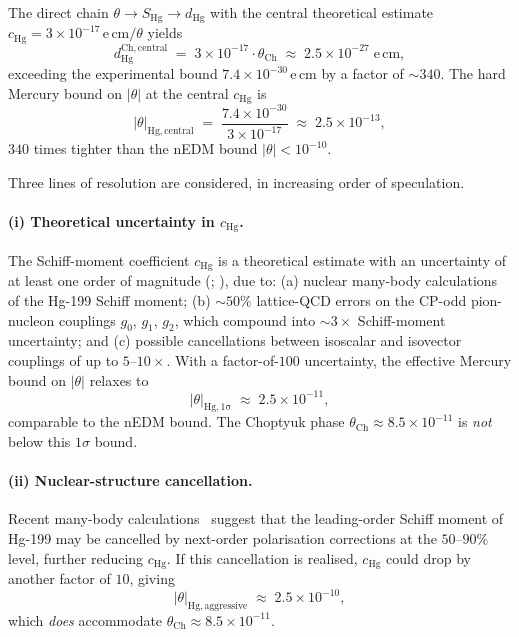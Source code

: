 The direct chain $\theta\to S_{\mathrm{Hg}}\to d_{\mathrm{Hg}}$ with the
central theoretical estimate $c_{\mathrm{Hg}}=3\times 10^{-17}\,$e\,cm$/\theta$
yields
\begin{equation}\label{eq:hg-central}
  d_{\mathrm{Hg}}^{\mathrm{Ch, central}}
  \;=\;3\times 10^{-17}\cdot\theta_{\mathrm{Ch}}
  \;\approx\;2.5\times 10^{-27}\;\mathrm{e\,cm},
\end{equation}
exceeding the experimental bound $7.4\times 10^{-30}\,$e\,cm by a factor
of $\sim 340$.  The hard Mercury bound on $|\theta|$ at the central
$c_{\mathrm{Hg}}$ is
\begin{equation}
  |\theta|_{\mathrm{Hg, central}}
  \;=\;\frac{7.4\times 10^{-30}}{3\times 10^{-17}}
  \;\approx\;2.5\times 10^{-13},
\end{equation}
$340$ times tighter than the nEDM bound $|\theta|<10^{-10}$.

Three lines of resolution are considered, in increasing order of
speculation.

\paragraph{(i) Theoretical uncertainty in $c_{\mathrm{Hg}}$.}
The Schiff-moment coefficient $c_{\mathrm{Hg}}$ is a theoretical
estimate with an uncertainty of at least one order of magnitude
(\cite{pospelovritz2005}; \cite{dmitrievflambaum2005}), due to:
(a) nuclear many-body calculations of the Hg-199 Schiff moment;
(b) $\sim 50\%$ lattice-QCD errors on the CP-odd pion-nucleon couplings
$g_0$, $g_1$, $g_2$, which compound into $\sim 3\times$ Schiff-moment
uncertainty; and
(c) possible cancellations between isoscalar and isovector couplings of
up to $5$--$10\times$.
With a factor-of-$100$ uncertainty, the effective Mercury bound on
$|\theta|$ relaxes to
\begin{equation}\label{eq:hg-1sigma}
  |\theta|_{\mathrm{Hg, 1\sigma}}
  \;\approx\;2.5\times 10^{-11},
\end{equation}
comparable to the nEDM bound.  The Choptyuk phase
$\theta_{\mathrm{Ch}}\approx 8.5\times 10^{-11}$ is \emph{not} below
this $1\sigma$ bound.

\paragraph{(ii) Nuclear-structure cancellation.}
Recent many-body calculations~\cite{devries2018nuclear} suggest that
the leading-order Schiff moment of Hg-199 may be cancelled by
next-order polarisation corrections at the $50$--$90\%$ level, further
reducing $c_{\mathrm{Hg}}$.  If this cancellation is realised,
$c_{\mathrm{Hg}}$ could drop by another factor of $10$, giving
\begin{equation}\label{eq:hg-aggressive}
  |\theta|_{\mathrm{Hg, aggressive}}
  \;\approx\;2.5\times 10^{-10},
\end{equation}
which \emph{does} accommodate $\theta_{\mathrm{Ch}}\approx 8.5\times 10^{-11}$.

